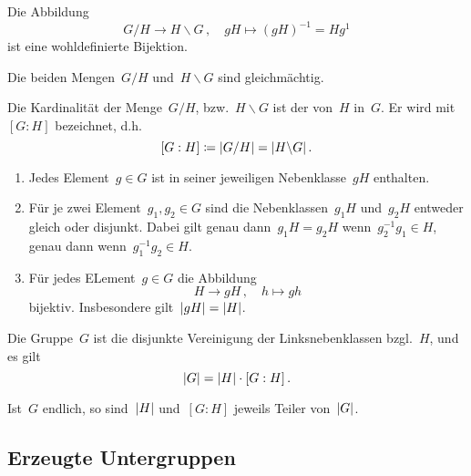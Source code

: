 \begin{proposition}
  Die Abbildung
  \[
    G/H
    \to
    H \backslash G \,,
    \quad
    gH
    \mapsto
    (gH)^{-1}
    =
    Hg^{1}
  \]
  ist eine wohldefinierte Bijektion.
\end{proposition}

\begin{corollary}
  Die beiden Mengen~$G/H$ und~$H \backslash G$ sind gleichmächtig.
\end{corollary}

\begin{definition}
  Die Kardinalität der Menge~$G/H$, bzw.~$H \backslash G$ ist der  von~$H$ in~$G$.
  Er wird mit~$[G : H]$ bezeichnet, d.h.
  \[
    [G : H]
    \coloneqq
    \lvert G/H \rvert
    =
    \lvert H \backslash G \rvert \,.
  \]
\end{definition}

\begin{lemma}
  \leavevmode
  \begin{enumerate}
    \item
      Jedes Element~$g \in G$ ist in seiner jeweiligen Nebenklasse~$gH$ enthalten.
    \item
      Für je zwei Element~$g_1, g_2 \in G$ sind die Nebenklassen~$g_1 H$ und~$g_2 H$ entweder gleich oder disjunkt.
      Dabei gilt genau dann~$g_1 H = g_2 H$ wenn~$g_2^{-1} g_1 \in H$, genau dann wenn~$g_1^{-1} g_2 \in H$.
    \item
      Für jedes ELement~$g \in G$ die Abbildung
      \[
        H \to gH \,,
        \quad
        h \mapsto gh
      \]
      bijektiv.
      Insbesondere gilt~$\lvert gH\rvert = \lvert H\rvert$.
  \end{enumerate}
\end{lemma}

\begin{corollary}
  Die Gruppe~$G$ ist die disjunkte Vereinigung der Linksnebenklassen bzgl.~$H$, und es gilt
  \[
    \lvert G\rvert = \lvert H\rvert \cdot [G : H] \,.
  \]
\end{corollary}

\begin{theorem}[Lagrange]
  Ist~$G$ endlich, so sind~$\lvert H\rvert$ und~$[G : H]$ jeweils Teiler von~$\lvert G\rvert$.
\end{theorem}



\subsection{Erzeugte Untergruppen}

